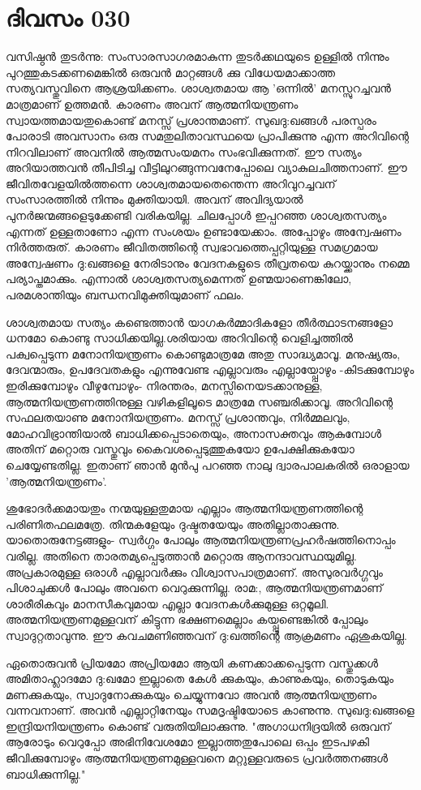 \newpage
\section{ദിവസം 030}


വസിഷ്ഠന്‍ തുടര്‍ന്നു: സംസാരസാഗരമാകുന്ന തുടര്‍ക്കഥയുടെ ഉള്ളില്‍ നിന്നും പുറത്തുകടക്കണമെങ്കില്‍ ഒരുവന്‍ മാറ്റങ്ങള്‍ ക്കു വിധേയമാക്കാത്ത സത്യവസ്തുവിനെ ആശ്രയിക്കണം. ശാശ്വതമായ ആ 'ഒന്നില്‍' മനസ്സുറച്ചവന്‍ മാത്രമാണ്‌ ഉത്തമന്‍. കാരണം അവന്‌ ആത്മനിയന്ത്രണം സ്വായത്തമായതുകൊണ്ട്‌ മനസ്സ്‌ പ്രശാന്തമാണ്‌. സുഖദു:ഖങ്ങള്‍ പരസ്പരം പോരാടി അവസാനം ഒരു സമതുലിതാവസ്ഥയെ പ്രാപിക്കുന്നു എന്ന അറിവിന്റെ നിറവിലാണ്‌ അവനില്‍ ആത്മസംയമനം സംഭവിക്കുന്നത്‌. ഈ സത്യം അറിയാത്തവന്‍ തീപിടിച്ച വീട്ടിലുറങ്ങുന്നവനേപ്പോലെ വ്യാകുലചിത്തനാണ്‌. ഈ ജീവിതവേളയില്‍ത്തന്നെ ശാശ്വതമായതെന്തെന്ന അറിവുറച്ചവന്‌ സംസാരത്തില്‍ നിന്നും മുക്തിയായി. അവന്‌ അവിദ്യയാല്‍ പുനര്‍ജന്മങ്ങളെടുക്കേണ്ടി വരികയില്ല. ചിലപ്പോള്‍ ഇപ്പറഞ്ഞ ശാശ്വതസത്യം എന്നത്‌ ഉള്ളതാണോ എന്ന സംശയം ഉണ്ടായേക്കാം. അപ്പോഴും അന്വേഷണം നിര്‍ത്തരുത്‌. കാരണം ജീവിതത്തിന്റെ സ്വഭാവത്തെപ്പറ്റിയുള്ള സമഗ്രമായ അന്വേഷണം ദു:ഖങ്ങളെ നേരിടാനും വേദനകളുടെ തീവ്രതയെ കുറയ്ക്കാനും നമ്മെ പര്യാപ്തമാക്കും. എന്നാല്‍ ശാശ്വതസത്യമെന്നത്‌ ഉണ്മയാണെങ്കിലോ, പരമശാന്തിയും ബന്ധനവിമുക്തിയുമാണ്‌ ഫലം.

ശാശ്വതമായ സത്യം കണ്ടെത്താന്‍ യാഗകര്‍മ്മാദികളോ തീര്‍ത്ഥാടനങ്ങളോ ധനമോ കൊണ്ടു സാധിക്കയില്ല.ശരിയായ അറിവിന്റെ വെളിച്ചത്തില്‍ പക്വപ്പെടുന്ന മനോനിയന്ത്രണം കൊണ്ടുമാത്രമേ അതു സാദ്ധ്യമാവൂ. മനുഷ്യരും, ദേവന്മാരും, ഉപദേവതകളും എന്നുവേണ്ട എല്ലാവരും എല്ലായ്പ്പോഴും -കിടക്കുമ്പോഴും ഇരിക്കുമ്പോഴും വീഴുമ്പോഴും- നിരന്തരം, മനസ്സിനെയടക്കാനുള്ള, ആത്മനിയന്ത്രണത്തിനുള്ള വഴികളിലൂടെ മാത്രമേ സഞ്ചരിക്കാവൂ. അറിവിന്റെ സഫലതയാണു മനോനിയന്ത്രണം. മനസ്സ്‌ പ്രശാന്തവും, നിര്‍മ്മലവും, മോഹവിഭ്രാന്തിയാല്‍ ബാധിക്കപ്പെടാതെയും, അനാസക്തവും ആകുമ്പോള്‍ അതിന്‌ മറ്റൊരു വസ്തുവും കൈവശപ്പെടുത്തുകയോ ഉപേക്ഷിക്കുകയോ ചെയ്യേണ്ടതില്ല. ഇതാണ്‌ ഞാന്‍ മുന്‍പു പറഞ്ഞ നാലു ദ്വാരപാലകരില്‍ ഒരാളായ 'ആത്മനിയന്ത്രണം'.

ശുഭോദര്‍ക്കമായതും നന്മയുള്ളതുമായ എല്ലാം ആത്മനിയന്ത്രണത്തിന്റെ പരിണിതഫലമത്രേ. തിന്മകളേയും ദുഷ്ടതയേയും അതില്ലാതാക്കുന്നു. യാതൊരുനേട്ടങ്ങളും- സ്വര്‍ഗ്ഗം പോലും ആത്മനിയന്ത്രണപ്രഹര്‍ഷത്തിനൊപ്പം വരില്ല. അതിനെ താരതമ്യപ്പെടുത്താന്‍ മറ്റൊരു ആനന്ദാവസ്ഥയുമില്ല. അപ്രകാരമുള്ള ഒരാള്‍ എല്ലാവര്‍ക്കും വിശ്വാസപാത്രമാണ്‌. അസുരവര്‍ഗ്ഗവും പിശാചുക്കള്‍ പോലും അവനെ വെറുക്കുന്നില്ല. രാമ:, ആത്മനിയന്ത്രണമാണ്‌ ശാരീരികവും മാനസീകവുമായ എല്ലാ വേദനകള്‍ക്കുമുള്ള ഒറ്റമൂലി. അത്മനിയന്ത്രണമുള്ളവന്‌ കിട്ടുന്ന ഭക്ഷണമെല്ലാം കയ്പ്പുണ്ടെങ്കില്‍ പ്പോലും സ്വാദുറ്റതാവുന്നു. ഈ കവചമണിഞ്ഞവന്‌ ദു:ഖത്തിന്റെ ആക്രമണം ഏശുകയില്ല. 

ഏതൊരുവന്‍ പ്രിയമോ അപ്രിയമോ ആയി കണക്കാക്കപ്പെടുന്ന വസ്തുക്കള്‍ അമിതാഹ്ലാദമോ ദു:ഖമോ ഇല്ലാതെ കേള്‍ ക്കുകയും, കാണുകയും, തൊടുകയും മണക്കുകയും, സ്വാദുനോക്കുകയും ചെയ്യുന്നവോ അവന്‍ ആത്മനിയന്ത്രണം വന്നവനാണ്‌. അവന്‍ എല്ലാറ്റിനേയും സമദൃഷ്ടിയോടെ കാണുന്നു. സുഖദു:ഖങ്ങളെ ഇന്ദ്രിയനിയന്ത്രണം കൊണ്ട്‌ വരുതിയിലാക്കുന്നു. "അഗാധനിദ്രയില്‍ ഒരുവന്‌ ആരോടും വെറുപ്പോ അഭിനിവേശമോ ഇല്ലാത്തതുപോലെ ഒപ്പം ഇടപഴകി ജീവിക്കുമ്പോഴും ആത്മനിയന്ത്രണമുള്ളവനെ മറ്റുള്ളവരുടെ പ്രവര്‍ത്തനങ്ങള്‍ ബാധിക്കുന്നില്ല."
